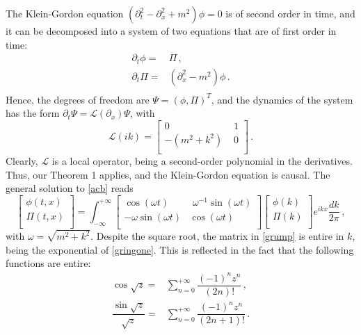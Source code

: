 \documentclass[prl, amsfonts, amssymb, amsmath, nofootinbib,reprint, showkeys, twoside,notitlepage]{revtex4-2}
\theoremstyle{definition}
\theoremstyle{theorem}
\theoremstyle{corollary}
\begin{document}
The Klein-Gordon equation $(\partial_t^2-\partial^2_x+m^2)\phi=0$ is of second order in time, and it can be decomposed into a system of two equations that are of first order in time:
\begin{equation}\label{acb}
\begin{split}
\partial_t \phi ={}& \Pi \, ,\\
\partial_t \Pi ={}& (\partial^2_x-m^2)\phi \, . \\
\end{split}
\end{equation}
Hence, the degrees of freedom are $\Psi=(\phi,\Pi)^T$, and the dynamics of the system has the form $\partial_t \Psi = \mathcal{L}(\partial_x)\Psi$, with
\begin{equation}\label{gringone}
\mathcal{L}(ik)= 
\begin{bmatrix}
0 & \, \, 1 \\
-(m^2{+}k^2) & \, \, 0 \\
\end{bmatrix} \, .
\end{equation}
Clearly, $\mathcal{L}$ is a local operator, being a second-order polynomial in the derivatives. Thus, our Theorem 1 applies, and the Klein-Gordon equation is causal. The general solution to  \eqref{acb} reads
\begin{equation}\label{grump}
\begin{bmatrix}
\phi(t,x)\\
\Pi(t,x) \\
\end{bmatrix} =\int_{-\infty}^{+\infty}
\begin{bmatrix}
\cos (\omega t) & \, \, \omega^{-1} \sin(\omega t) \\
-\omega \sin(\omega t)  & \cos (\omega t)  \\
\end{bmatrix}
\begin{bmatrix}
\phi(k) \\
\Pi(k) \\
\end{bmatrix} e^{ikx} \dfrac{dk}{2\pi} \, ,
\end{equation}
with $\omega=\sqrt{m^2+k^2}$. Despite the square root, the matrix in \eqref{grump} is entire in $k$, being the exponential of \eqref{gringone}. This is reflected in the fact that the following functions are entire:
\begin{equation}
\begin{split}
\cos \sqrt{z} ={}& \sum_{n=0}^{+\infty} \dfrac{(-1)^n z^n}{(2n)!} \, , \\
\dfrac{\sin\sqrt{z}}{\sqrt{z}}={}& \sum_{n=0}^{+\infty} \dfrac{(-1)^n z^n}{(2n+1)!} \, . \\
\end{split}
\end{equation}
\end{document}
